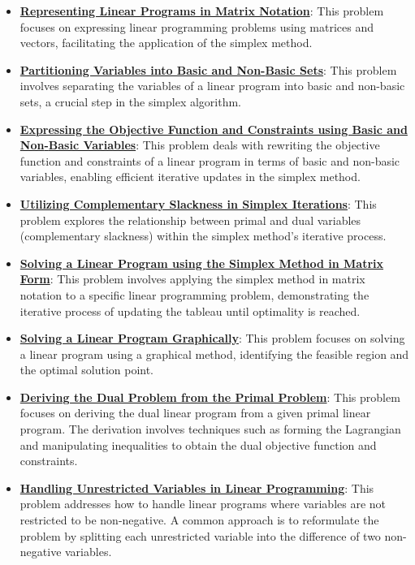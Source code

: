 \documentclass{article}%
\begin{document}
\begin{itemize}[leftmargin=*]%
\item \href{https://www.math.purdue.edu/~yipn/421/2024-09-24-SimplexMatrix.pdf#page=1}{\textbf{Representing Linear Programs in Matrix Notation}}: This problem focuses on expressing linear programming problems using matrices and vectors, facilitating the application of the simplex method.%
\item \href{https://www.math.purdue.edu/~yipn/421/2024-09-24-SimplexMatrix.pdf#page=4}{\textbf{Partitioning Variables into Basic and Non{-}Basic Sets}}: This problem involves separating the variables of a linear program into basic and non-basic sets, a crucial step in the simplex algorithm.%
\item \href{https://www.math.purdue.edu/~yipn/421/2024-09-24-SimplexMatrix.pdf#page=8}{\textbf{Expressing the Objective Function and Constraints using Basic and Non{-}Basic Variables}}: This problem deals with rewriting the objective function and constraints of a linear program in terms of basic and non-basic variables, enabling efficient iterative updates in the simplex method.%
\item \href{https://www.math.purdue.edu/~yipn/421/2024-09-24-SimplexMatrix.pdf#page=14}{\textbf{Utilizing Complementary Slackness in Simplex Iterations}}: This problem explores the relationship between primal and dual variables (complementary slackness) within the simplex method's iterative process.%
\item \href{https://www.math.purdue.edu/~yipn/421/2024-09-24-SimplexMatrix.pdf#page=15}{\textbf{Solving a Linear Program using the Simplex Method in Matrix Form}}: This problem involves applying the simplex method in matrix notation to a specific linear programming problem, demonstrating the iterative process of updating the tableau until optimality is reached.%
\item \href{https://www.math.purdue.edu/~yipn/421/2024-09-24-SimplexMatrix.pdf#page=21}{\textbf{Solving a Linear Program Graphically}}: This problem focuses on solving a linear program using a graphical method, identifying the feasible region and the optimal solution point.%
\end{itemize}%
\begin{itemize}[leftmargin=*]%
\item \href{https://www.math.purdue.edu/~yipn/421/2024-10-01-DualGeneralLP.pdf#page=1}{\textbf{Deriving the Dual Problem from the Primal Problem}}: This problem focuses on deriving the dual linear program from a given primal linear program. The derivation involves techniques such as forming the Lagrangian and manipulating inequalities to obtain the dual objective function and constraints.%
\item \href{https://www.math.purdue.edu/~yipn/421/2024-10-01-DualGeneralLP.pdf#page=2}{\textbf{Handling Unrestricted Variables in Linear Programming}}: This problem addresses how to handle linear programs where variables are not restricted to be non-negative. A common approach is to reformulate the problem by splitting each unrestricted variable into the difference of two non-negative variables.%
\end{itemize}%
\end{document}
